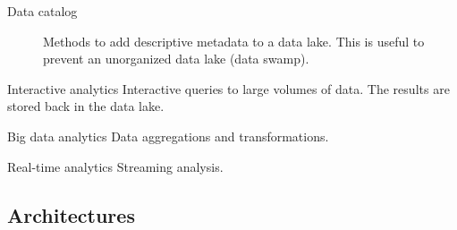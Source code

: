 \begin{description}
\begin{description}
            \item[Data catalog]
                Methods to add descriptive metadata to a data lake.
                This is useful to prevent an unorganized data lake (data swamp).
        \end{description}
        
    
    \item[Processing and analytics] 
        \phantom{}
        \begin{descriptionlist}
            \item[Interactive analytics]
                Interactive queries to large volumes of data.
                The results are stored back in the data lake.
            \item[Big data analytics]
                Data aggregations and transformations.
            \item[Real-time analytics]   
                Streaming analysis.
        \end{descriptionlist}
\end{description}


\subsection{Architectures}

